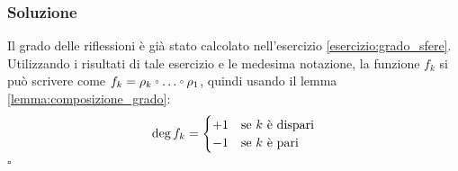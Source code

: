 \documentclass[10pt, toc=sectionentrywithdots]{scrartcl}
\let\latexcirc=\circ
\newcommand{\ccirc}{\mathbin{\mathchoice
  {\xcirc\scriptstyle}
  {\xcirc\scriptstyle}
  {\xcirc\scriptscriptstyle}
  {\xcirc\scriptscriptstyle}
}}
\newcommand{\xcirc}[1]{\vcenter{\hbox{$#1\latexcirc$}}}
\let\circ\ccirc
\begin{document}
\subsubsection*{Soluzione}

Il grado delle riflessioni è già stato calcolato nell'esercizio
\ref{esercizio:grado_sfere}. Utilizzando i risultati di tale esercizio e le
medesima notazione, la funzione $ f_k $ si può scrivere come
$ f_k = \rho_k \circ \dots \circ \rho_1 $, quindi usando il lemma \ref{lemma:composizione_grado}:
\[
  \deg {f_k} =
  \begin{cases}
    + 1 & \text{se $ k $ è dispari} \\
    - 1 & \text{se $ k $ è pari}
  \end{cases}
\]
\hfill $ \square $
\end{document}
